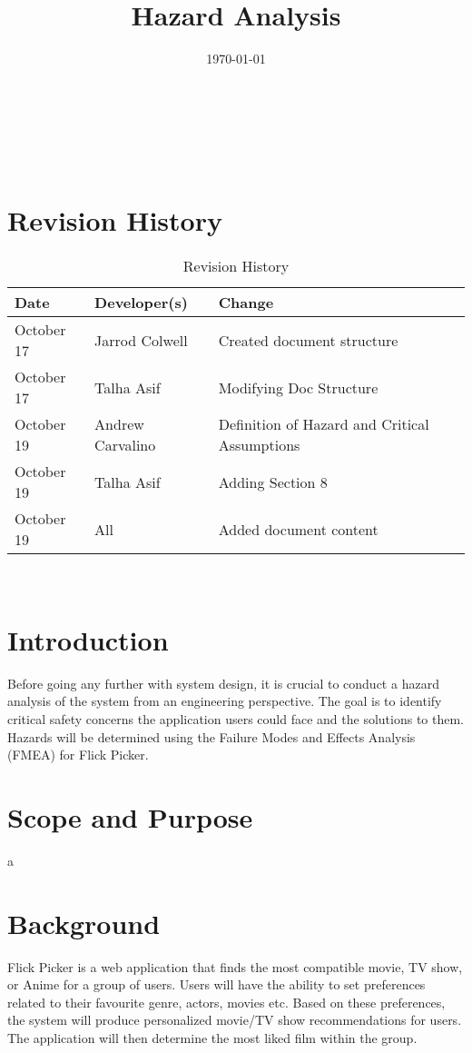\documentclass[12pt]{article}
\title{Hazard Analysis\\\progname}
\author{\authname}
\date{\today}
\begin{document}
\maketitle

~\newpage {}

\tableofcontents

~\newpage

\section*{Revision History}
\begin{table}[hp]
	\caption{Revision History} \label{TblRevisionHistory}
	\begin{tabularx}{\textwidth}{llX}
		\toprule
		\textbf{Date} & \textbf{Developer(s)} & \textbf{Change}\\
		\midrule
		October 17 & Jarrod Colwell & Created document structure\\
		October 17 & Talha Asif & Modifying Doc Structure\\
		October 19 & Andrew Carvalino & Definition of Hazard and Critical Assumptions\\
		October 19 & Talha Asif & Adding Section 8\\
		October 19 & All & Added document content\\
		\bottomrule
		\end{tabularx}
\end{table}

~\newpage {}

\section{Introduction}
Before going any further with system design, it is crucial to conduct a hazard analysis of the system from an engineering perspective. The goal is to identify critical safety concerns the application users could face and the solutions to them. Hazards will be determined using the Failure Modes and Effects Analysis (FMEA) for Flick Picker.

\section{Scope and Purpose}
a

\section{Background}
Flick Picker is a web application that finds the most compatible movie, TV show, or Anime for a group of users. Users will have the ability to set preferences related to their favourite genre, actors, movies etc. Based on these preferences, the system will produce personalized movie/TV show recommendations for users. The application will then determine the most liked film within the group.    
\end{document}
